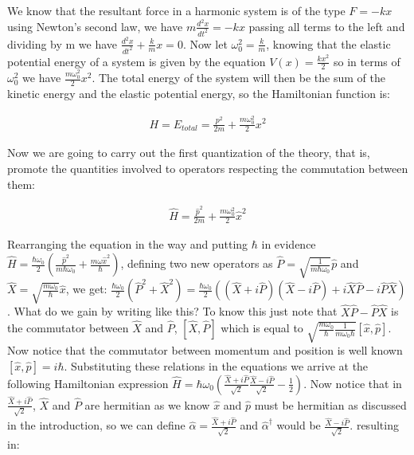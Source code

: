\documentclass[
  journal=largetwo,
  year=2023,
]{cup-journal}
\begin{document}
We know that the resultant force in a harmonic system is of the type \(F = -kx\) using Newton's second law, we have \(m\frac{d^2x}{dt^2} = -kx\) passing all terms to the left and dividing by m we have \(\frac{d^2x}{dt^2} + \frac{k}{m}x = 0\). Now let \(\omega_0^{2} = \frac{k}{m}\), knowing that the elastic potential energy of a system is given by the equation \(V(x) = \frac{kx^2}{2}\) so in terms of \(\omega_0^{2}\) we have \(\frac{m\omega_0^{2}}{2}x^2\). The total energy of the system will then be the sum of the kinetic energy and the elastic potential energy, so the Hamiltonian function is:

\begin{equation}
  \begin{aligned}\label{eq:8}
    H = E_{total} = \frac{p^2}{2m} + \frac{m\omega_0^{2}}{2}x^2
  \end{aligned}
\end{equation}


Now we are going to carry out the first quantization of the theory, that is, promote the quantities involved to operators respecting the commutation between them:

\begin{equation}
  \begin{aligned}\label{eq:9}
    \hat{H} = \frac{\hat{p}^2}{2m} + \frac{m\omega_0^{2}}{2}\hat{x}^2
  \end{aligned}
\end{equation}


Rearranging the equation in the way and putting \(\hbar\) in evidence \(\hat{H} = \frac{\hbar\omega_0}{2}(\frac{\hat{p}^2}{m\hbar\omega_0} + \frac{m\omega\hat{x}^2}{\hbar})\), defining two new operators as \(\hat{P} = \sqrt{\frac{1}{m\hbar\omega_0}}\hat{p}\) and \(\hat{X} = \sqrt{\frac{m\omega_0}{\hbar}}\hat{x}\), we get: \(\frac{\hbar\omega_0}{2}(\hat{P}^2 + \hat{X}^2) = \frac{\hbar\omega_0}{2}((\hat{X} + i\hat{P})(\hat{X} - i\hat{P}) + i\hat{X}\hat{P} - i\hat{P}\hat{X})\). What do we gain by writing like this? To know this just note that \(\hat{X}\hat{P} - \hat{P}\hat{X}\) is the commutator between \(\hat{X}\) and \(\hat{P}\), \([\hat{X}, \hat{P}]\) which is equal to \(\sqrt{\frac{m\omega_0}{\hbar}\frac{1}{m\omega_0\hbar}}[\hat{x}, \hat{p}]\). Now notice that the commutator between momentum and position is well known \([\hat{x}, \hat{p}] = i\hbar\). Substituting these relations in the equations we arrive at the following Hamiltonian expression \(\hat{H} = \hbar\omega_0(\frac{\hat{X} + i\hat{P}}{\sqrt{2}}\frac{\hat{X}-i\hat{P}}{\sqrt{2}} - \frac{1}{2})\). Now notice that in \(\frac{\hat{X} + i\hat{P}}{\sqrt{2}}\), \(\hat{X}\) and \(\hat{P}\) are hermitian as we know \(\hat{x}\)  and \(\hat{p}\) must be hermitian as discussed in the introduction, so we can define \(\hat{\alpha} = \frac{\hat{X} + i\hat{P}}{\sqrt{2}}\) and \(\hat{\alpha}^{\dag}\) would be \(\frac{\hat{X} - i\hat{P}}{\sqrt{2}}\). resulting in:
\end{document}
